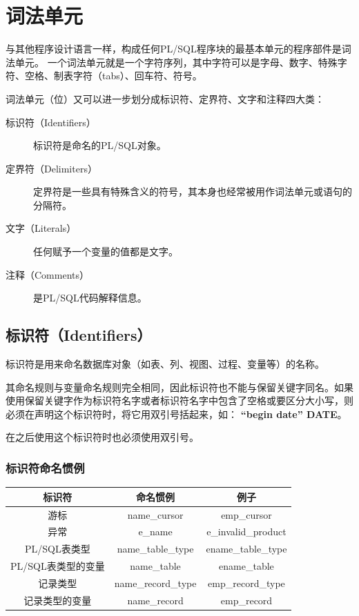 \documentclass[11pt, a4paper, oneside, UTF8]{ctexbook}
\let\kaishu\relax %
\begin{document}
\chapter{词法单元}
与其他程序设计语言一样，构成任何PL/SQL程序块的最基本单元的程序部件是词法单元。
一个词法单元就是一个字符序列，其中字符可以是字母、数字、特殊字符、空格、制表字符（tabs）、回车符、符号。

词法单元（位）又可以进一步划分成标识符、定界符、文字和注释四大类：
\begin{description}
  \item[标识符（Identifiers）] 标识符是命名的PL/SQL对象。
  \item[定界符（Delimiters）] 定界符是一些具有特殊含义的符号，其本身也经常被用作词法单元或语句的分隔符。
  \item[文字（Literals）] 任何赋予一个变量的值都是文字。
  \item[注释（Comments）] 是PL/SQL代码解释信息。
\end{description}

\section{标识符（Identifiers）}
标识符是用来命名数据库对象（如表、列、视图、过程、变量等）的名称。

其命名规则与变量命名规则完全相同，因此标识符也不能与保留关键字同名。如果使用保留关键字作为标识符名字或者标识符名字中包含了空格或要区分大小写，则必须在声明这个标识符时，将它用双引号括起来，如：  {\bfseries\kaishu “begin date” DATE}。

在之后使用这个标识符时也必须使用双引号。

\subsection{标识符命名惯例}

\begin{center}
  \begin{minipage}{\textwidth}
    \centering %
    \begin{tabular}{|c|c|c|} %
      \hline %
      \textbf{标识符} & \textbf{命名惯例}  & \textbf{例子} \\
      \hline
      游标 & name\_cursor & emp\_cursor \\
      异常 & e\_name & e\_invalid\_product \\
      PL/SQL表类型 & name\_table\_type & ename\_table\_type \\
      PL/SQL表类型的变量 & name\_table  & ename\_table \\
      记录类型 & name\_record\_type & emp\_record\_type \\
      记录类型的变量 & name\_record & emp\_record \\
      \hline
    \end{tabular}
    \captionsetup{hypcap=false}
    \label{tab:标识符命名惯例} %
  \end{minipage}
\end{center}
\end{document}
